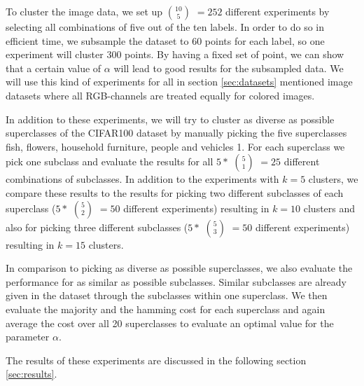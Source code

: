 To cluster the image data, we set up $10 \choose 5$ $= 252$ different experiments by selecting all combinations of five out of the ten labels. In order to do so in efficient time, we subsample the dataset to 60 points for each label, so one experiment will cluster 300 points. By having a fixed set of point, we can show that a certain value of $\alpha$ will lead to good results for the subsampled data. We will use this kind of experiments for all in section \ref{sec:datasets} mentioned image datasets where all RGB-channels are treated equally for colored images.

In addition to these experiments, we will try to cluster as diverse as possible superclasses of the CIFAR100 dataset by manually picking the five superclasses fish, flowers, household furniture, people and vehicles 1. For each superclass we pick one subclass and evaluate the results for all $5 *$ $5 \choose 1$ $= 25$ different combinations of subclasses. In addition to the experiments with $k = 5$ clusters, we compare these results to the results for picking two different subclasses of each superclass ($5 *$ $5 \choose 2$ $= 50$ different experiments) resulting in $k = 10$ clusters and also for picking three different subclasses ($5 *$ $5 \choose 3$ $= 50$ different experiments) resulting in $k = 15$ clusters.

In comparison to picking as diverse as possible superclasses, we also evaluate the performance for as similar as possible subclasses. Similar subclasses are already given in the dataset through the subclasses within one superclass. We then evaluate the majority and the hamming cost for each superclass and again average the cost over all 20 superclasses to evaluate an optimal value for the parameter $\alpha$.

The results of these experiments are discussed in the following section \ref{sec:results}.